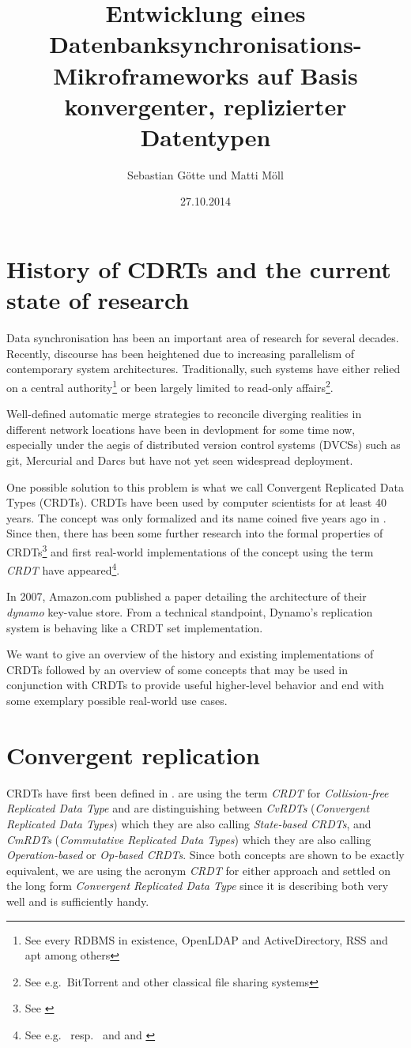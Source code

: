 \documentclass[12pt,a4paper,notitlepage]{article}
\author{Sebastian Götte und Matti Möll}
\title{Entwicklung eines Datenbanksynchronisations-Mikroframeworks auf Basis konvergenter, replizierter Datentypen}
\date{27.10.2014}
\begin{document}
\maketitle

\section{History of CDRTs and the current state of research}
Data synchronisation has been an important area of research for several decades. Recently, discourse has been heightened
due to increasing parallelism of contemporary system architectures. Traditionally, such systems have either relied on a
central authority\footnote{See every RDBMS in existence, OpenLDAP and ActiveDirectory, RSS and apt among others} or been
largely limited to read-only affairs\footnote{See e.g.\ BitTorrent and other classical file sharing systems}.

Well-defined automatic merge strategies to reconcile diverging realities in different network locations have been in
devlopment for some time now, especially under the aegis of distributed version control systems (DVCSs) such as git,
Mercurial and Darcs but have not yet seen widespread deployment.

One possible solution to this problem is what we call Convergent Replicated Data Types (CRDTs). CRDTs have been used by
computer scientists for at least 40 years. The concept was only formalized and its name coined five years ago in
\cite{inria09}. Since then, there has been some further research into the formal properties of CRDTs\footnote{See
\cite{inria11}} and first real-world implementations of the concept using the term \emph{CRDT} have appeared\footnote{See
e.g.\ \cite{riak} resp.\ \cite{riak20-announcement} and \cite{riak-crdt} and \cite{roshi}}.

In 2007, Amazon.com published a paper detailing the architecture of their \emph{dynamo} key-value store. From a technical
standpoint, Dynamo's replication system is behaving like a CRDT set implementation.

We want to give an overview of the history and existing implementations of CRDTs followed by an overview of some
concepts that may be used in conjunction with CRDTs to provide useful higher-level behavior and end with some exemplary
possible real-world use cases.

\section{Convergent replication}
CRDTs have first been defined in \cite{inria09}. \cite{inria09} are using the term \emph{CRDT} for \emph{Collision-free
Replicated Data Type} and are distinguishing between \emph{CvRDTs} (\emph{Convergent Replicated Data Types}) which they are
also calling \emph{State-based CRDTs}, and \emph{CmRDTs} (\emph{Commutative Replicated Data Types}) which they are also
calling \emph{Operation-based} or \emph{Op-based CRDTs}. Since both concepts are shown to be exactly equivalent, we are
using the acronym \emph{CRDT} for either approach and settled on the long form \emph{Convergent Replicated Data Type} since
it is describing both very well and is sufficiently handy.
\end{document}
